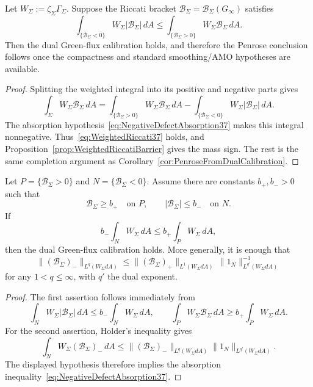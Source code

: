 \begin{theorem}\label{thm:LocalizedNegativeDefectAbsorption}
Let \(W_\Sigma:=\zeta_\Sigma\Gamma_\Sigma\). Suppose the Riccati bracket
\(\mathcal B_\Sigma=\mathcal B_\Sigma(G_\infty)\) satisfies
\begin{equation}\label{eq:NegativeDefectAbsorption37}
    \int_{\{\mathcal B_\Sigma<0\}} W_\Sigma|\mathcal B_\Sigma|\,dA
    \le
    \int_{\{\mathcal B_\Sigma>0\}} W_\Sigma\mathcal B_\Sigma\,dA .
\end{equation}
Then the dual Green-flux calibration holds, and therefore the Penrose conclusion follows once the compactness and standard smoothing/AMO hypotheses are available.
\end{theorem}

\begin{proof}
Splitting the weighted integral into its positive and negative parts gives
\[
    \int_\Sigma W_\Sigma\mathcal B_\Sigma\,dA
    =
    \int_{\{\mathcal B_\Sigma>0\}}W_\Sigma\mathcal B_\Sigma\,dA
    -
    \int_{\{\mathcal B_\Sigma<0\}}W_\Sigma|\mathcal B_\Sigma|\,dA .
\]
The absorption hypothesis~\eqref{eq:NegativeDefectAbsorption37} makes this integral nonnegative. Thus~\eqref{eq:WeightedRiccati37} holds, and Proposition~\ref{prop:WeightedRiccatiBarrier} gives the mass sign. The rest is the same completion argument as Corollary~\ref{cor:PenroseFromDualCalibration}.
\end{proof}

\begin{corollary}\label{cor:QuantitativeAbsorption37}
Let \(P=\{\mathcal B_\Sigma>0\}\) and \(N=\{\mathcal B_\Sigma<0\}\). Assume there are constants \(b_+,b_->0\) such that
\[
    \mathcal B_\Sigma\ge b_+\quad\text{on }P,\qquad
    |\mathcal B_\Sigma|\le b_-\quad\text{on }N .
\]
If
\begin{equation}\label{eq:QuantAbsorption37}
    b_- \int_N W_\Sigma\,dA
    \le
    b_+ \int_P W_\Sigma\,dA ,
\end{equation}
then the dual Green-flux calibration holds. More generally, it is enough that
\[
    \|(\mathcal B_\Sigma)_-\|_{L^q(W_\Sigma dA)}
    \le
    \|(\mathcal B_\Sigma)_+\|_{L^1(W_\Sigma dA)}
    \, \|1_N\|_{L^{q'}(W_\Sigma dA)}^{-1}
\]
for any \(1<q\le\infty\), with \(q'\) the dual exponent.
\end{corollary}

\begin{proof}
The first assertion follows immediately from
\[
    \int_N W_\Sigma|\mathcal B_\Sigma|\,dA
    \le b_-\int_NW_\Sigma\,dA,\qquad
    \int_P W_\Sigma\mathcal B_\Sigma\,dA
    \ge b_+\int_PW_\Sigma\,dA .
\]
For the second assertion, Holder's inequality gives
\[
    \int_N W_\Sigma(\mathcal B_\Sigma)_-\,dA
    \le
    \|(\mathcal B_\Sigma)_-\|_{L^q(W_\Sigma dA)}
    \|1_N\|_{L^{q'}(W_\Sigma dA)} .
\]
The displayed hypothesis therefore implies the absorption inequality~\eqref{eq:NegativeDefectAbsorption37}.
\end{proof}

